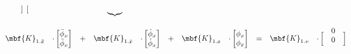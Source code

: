 \documentclass[crop=false,float=true,class=scrreprt]{standalone}
\begin{document}
\begin{landscape}
\begin{equation}
\begin{array}{ccccccccccc}
{{\begin{bmatrix}
\end{bmatrix}
}
}_{}
&&&
\hphantom{\cdot}
\underbrace{
\hphantom{
\begin{bmatrix}
\ddot{\phi}_{x}\\
\end{bmatrix}
}
}_{}
\\[+2em]
\mbf{K}_{1.\ddot{x}}
& \cdot 
\begin{bmatrix}
\ddot{\phi}_{x}\\
\ddot{\phi}_{x}\\
\end{bmatrix}
& + &
\mbf{K}_{1.\dot{x}}
& \cdot 
\begin{bmatrix}
\dot{\phi}_{x}\\
\dot{\phi}_{x}\\
\end{bmatrix}
& + &
\mbf{K}_{1.x}
& \cdot 
\begin{bmatrix}
\phi_{x}\\
\phi_{x}\\
\end{bmatrix}
& = &
\mbf{K}_{1.v}
& \cdot
\begin{bmatrix}
\hphantom{v_{mtr.r}}\\[-2em]
0\\
0\\
\end{bmatrix}
\\[+0.5em]


\end{array}
\end{equation}
\end{landscape}
\end{document}
